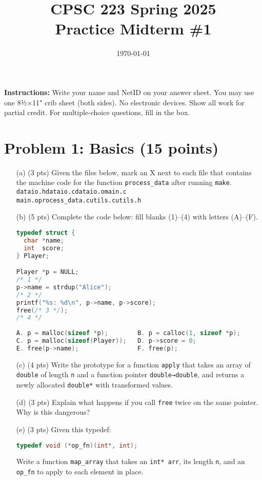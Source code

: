 \documentclass[12pt]{article}
\begin{document}
\title{CPSC 223 Spring 2025\\Practice Midterm \#1}
\author{}
\date{\today}
\maketitle

\noindent\textbf{Instructions:} Write your name and NetID on your answer sheet. You may use one 8½×11" crib sheet (both sides). No electronic devices. Show all work for partial credit. For multiple-choice questions, fill in the box.

\vspace{1em}

\section*{Problem 1: Basics (15 points)}
\begin{enumerate}
  \item[(a)] (3 pts) Given the files below, mark an X next to each file that contains the machine code for the function \texttt{process\_data} after running \texttt{make}.\\
  \texttt{dataio.h}\quad \texttt{dataio.c}\quad \texttt{dataio.o}\quad \texttt{main.c}\\
  \texttt{main.o}\quad \texttt{process\_data.c}\quad \texttt{utils.c}\quad \texttt{utils.h}
  \\

  \item[(b)] (5 pts) Complete the code below: fill blanks (1)--(4) with letters (A)--(F).\\
  \begin{lstlisting}[language=C]
typedef struct {
  char *name;
  int  score;
} Player;

Player *p = NULL;
/* 1 */
p->name = strdup("Alice");
/* 2 */
printf("%s: %d\n", p->name, p->score);
free(/* 3 */);
/* 4 */
  
A. p = malloc(sizeof *p);        B. p = calloc(1, sizeof *p);
C. p = malloc(sizeof(Player));   D. p->score = 0;
E. free(p->name);                F. free(p);
  \end{lstlisting}

  \item[(c)] (4 pts) Write the prototype for a function \texttt{apply} that takes an array of \texttt{double} of length \texttt{n} and a function pointer \texttt{double→double}, and returns a newly allocated \texttt{double*} with transformed values.

  \item[(d)] (3 pts) Explain what happens if you call \texttt{free} twice on the same pointer. Why is this dangerous?

  \item[(e)] (3 pts) Given this typedef:
  \begin{lstlisting}[language=C]
typedef void (*op_fn)(int*, int);
  \end{lstlisting}
  Write a function \texttt{map\_array} that takes an \texttt{int* arr}, its length \texttt{n}, and an \texttt{op\_fn} to apply to each element in place.
\end{enumerate}
\end{document}
